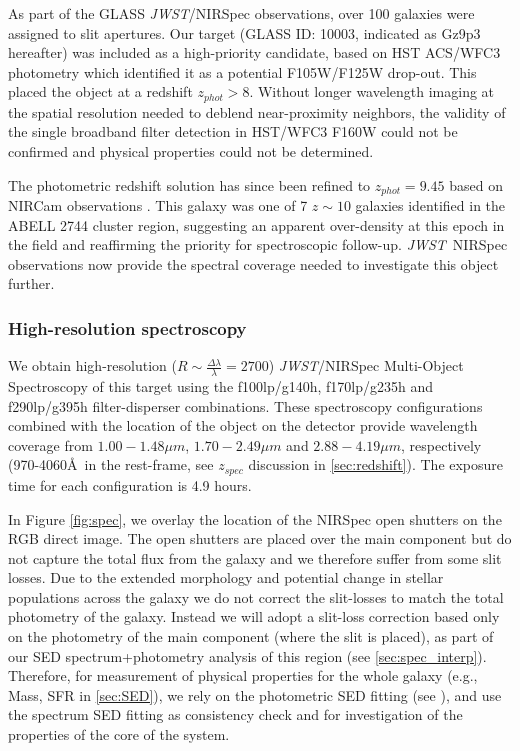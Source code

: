 \documentclass[sn-mathphys]{sn-jnl}%
\theoremstyle{thmstyleone}%
\theoremstyle{thmstyletwo}%
\theoremstyle{thmstylethree}%
\newcommand{\jwst}{\textit{JWST}}
\begin{document}
As part of the GLASS \jwst/NIRSpec observations, over 100 galaxies were assigned to slit apertures. Our target (GLASS ID: 10003, indicated as Gz9p3 hereafter) was included as a high-priority candidate, based on HST ACS/WFC3 photometry \citep{Castellano2016} which identified it as a potential F105W/F125W drop-out. This placed the object at a redshift $z_{phot}>8$. Without longer wavelength imaging at the spatial resolution needed to deblend near-proximity neighbors, the validity of the single broadband filter detection in HST/WFC3 F160W could not be confirmed and physical properties could not be determined. 

The photometric redshift solution has since been refined to $z_{phot}=9.45$ based on NIRCam observations \citep[ID: DHZ1 in][]{Castellano22b}. This galaxy was one of 7 $z\sim10$ galaxies identified in the ABELL 2744 cluster region, suggesting an apparent over-density at this epoch in the field and reaffirming the priority for spectroscopic follow-up. \jwst\ NIRSpec observations now provide the spectral coverage needed to investigate this object further. 



\subsubsection{High-resolution spectroscopy}\label{sec:obs_spec}
We obtain high-resolution ($R\sim\frac{\Delta\lambda}{\lambda}=2700$) \jwst/NIRSpec Multi-Object Spectroscopy of this target using the f100lp/g140h, f170lp/g235h and f290lp/g395h filter-disperser combinations.
These spectroscopy configurations combined with the location of the object on the detector provide wavelength coverage from $1.00-1.48\mu m$, $1.70-2.49\mu m$ and $2.88-4.19\mu m$, respectively (970-4060\AA\ in the rest-frame, see $z_{spec}$ discussion in \ref{sec:redshift}). The exposure time for each configuration is 4.9 hours. 
 

In Figure \ref{fig:spec}, we overlay the location of the NIRSpec open shutters on the RGB direct image. The open shutters are placed over the main component but do not capture the total flux from the galaxy and we therefore suffer from some slit losses. 
Due to the extended morphology and potential change in stellar populations across the galaxy we do not correct the slit-losses to match the total photometry of the galaxy. Instead we will adopt a slit-loss correction based only on the photometry of the main component (where the slit is placed), as part of our SED spectrum+photometry analysis of this region (see  \ref{sec:spec_interp}).
Therefore, for measurement of physical properties for the whole galaxy (e.g., Mass, SFR in \ref{sec:SED}), we rely on the photometric SED fitting (see \cite{Paris23}), and use the spectrum SED fitting as consistency check and for investigation of the properties of the core of the system. 
\end{document}
